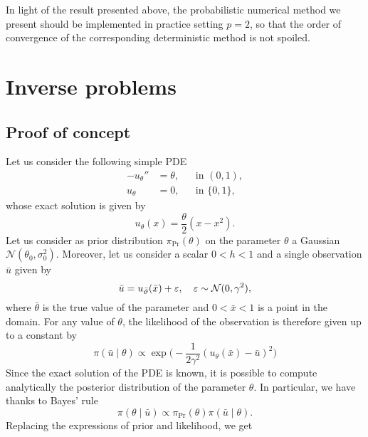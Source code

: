 \documentclass[10pt]{article}
\begin{document}
\begin{remark} In light of the result presented above, the probabilistic numerical method we present should be implemented in practice setting $p = 2$, so that the order of convergence of the corresponding deterministic method is not spoiled.	
\end{remark}

\section{Inverse problems}
\subsection{Proof of concept} Let us consider the following simple PDE
\begin{equation}\label{eq:TestPDEInverse}
\begin{aligned}
-u_\theta'' &= \theta, && \text{in } (0, 1),\\
u_\theta &= 0, && \text{in } \{0, 1\},
\end{aligned}
\end{equation}
whose exact solution is given by
\begin{equation}
	u_\theta(x) = \frac{\theta}{2}(x - x^2).
\end{equation}
Let us consider as prior distribution $\pi_{\mathrm{Pr}}(\theta)$ on the parameter $\theta$ a Gaussian $\mathcal{N}(\theta_0, \sigma_0^2)$. Moreover, let us consider a scalar $0 < h < 1$ and a single observation $\bar u$ given by
\begin{equation}
	\bar u = u_{\bar {\vartheta}}(\bar x) + \varepsilon, \quad \varepsilon \sim \mathcal{N}(0, \gamma^2),
\end{equation}
where $\bar \theta$ is the true value of the parameter and $0 < \bar x < 1$ is a point in the domain. For any value of $\theta$, the likelihood of the observation is therefore given up to a constant by
\begin{equation}
	\pi(\bar u \mid \theta) \propto \exp\Big(-\frac{1}{2\gamma^2}(u_\theta(\bar x) - \bar u )^2 \Big)
\end{equation}
Since the exact solution of the PDE is known, it is possible to compute analytically the posterior distribution of the parameter $\theta$. In particular, we have thanks to Bayes' rule
\begin{equation}
	\pi(\theta \mid \bar u) \propto \pi_{\mathrm{Pr}}(\theta) \pi(\bar u \mid \theta).
\end{equation}
Replacing the expressions of prior and likelihood, we get
\end{document}
